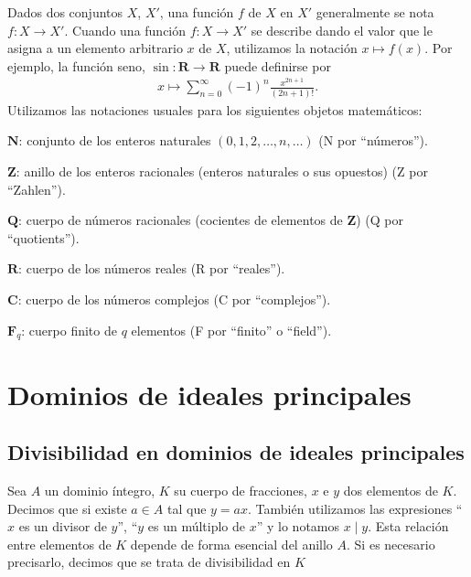 \documentclass[bibtotoc,leqno,spanish]{amsbook}
\let\emph\relax %
\newcommand{\RR}{\mathbf{R}}
\newcommand{\QQ}{\mathbf{Q}}
\newcommand{\ZZ}{\mathbf{Z}}
\newcommand{\NN}{\mathbf{N}}
\newcommand{\FF}{\mathbf{F}}
\newcommand{\CC}{\mathbf{C}}
\renewcommand{\to}[1][]{\xrightarrow{#1}}
\numberwithin{equation}{section}
\theoremstyle{note}
\theoremstyle{note}
\theoremstyle{rem}
\numberwithin{theorem}{section}
\numberwithin{proposition}{section}
\numberwithin{definition}{section}
\numberwithin{lemma}{section}
\numberwithin{corollary}{section}
\numberwithin{example}{section}
\numberwithin{footnote}{section}%
\begin{document}
Dados dos conjuntos $X$, $X'$, una funci\'on $f$ de $X$ en $X'$ generalmente se nota
$f:X\to X'$. Cuando una funci\'on $f:X\to X'$ se describe dando el valor que
le asigna a un elemento arbitrario $x$ de $X$, utilizamos la notaci\'on $x\mapsto f(x)$.
Por ejemplo, la funci\'on seno, $\sin:\RR\to\RR$ puede definirse por
\begin{gather*}
x\mapsto\sum_{n=0}^{\infty}(-1)^{n}\frac{x^{2n+1}}{(2n+1)!}.
\end{gather*}
Utilizamos las notaciones usuales para los siguientes objetos matem\'aticos:

\begin{trivlist}\setlength{\itemindent}{\parindent}
\item[$\NN$:] conjunto de los enteros naturales $(0,1,2,\dots,n,\dots)$ (N por ``n\'umeros'').
\item[$\ZZ$:] anillo de los enteros racionales (enteros naturales o sus opuestos)
(Z por ``Zahlen'').
\item[$\QQ$:] cuerpo de n\'umeros racionales (cocientes de elementos de $\ZZ$) (Q por
``quotients'').
\item[$\RR$:] cuerpo de los n\'umeros reales (R por ``reales'').
\item[$\CC$:] cuerpo de los n\'umeros complejos (C por ``complejos'').
\item[$\FF_{q}$:] cuerpo finito de $q$ elementos (F por ``finito'' o ``field'').
\end{trivlist}

\mainmatter

\chapter{Dominios de ideales principales}\label{cap1}

\section{Divisibilidad en dominios de ideales principales}\label{sec1.1}

Sea $A$ un dominio \'integro, $K$ su cuerpo de fracciones, $x$ e $y$ dos elementos de $K$.
Decimos que \emph{$x$ divide a $y$} si existe $a\in A$ tal que $y = ax$. Tambi\'en utilizamos
las expresiones ``$x$ es un divisor de $y$'', ``$y$ es un m\'ultiplo de $x$'' y lo notamos $x\mid y$.
Esta relaci\'on entre elementos de $K$ depende de forma esencial del anillo $A$. Si es necesario
precisarlo, decimos que se trata de divisibilidad en $K$ \emph{respecto a $A$.}
\end{document}
